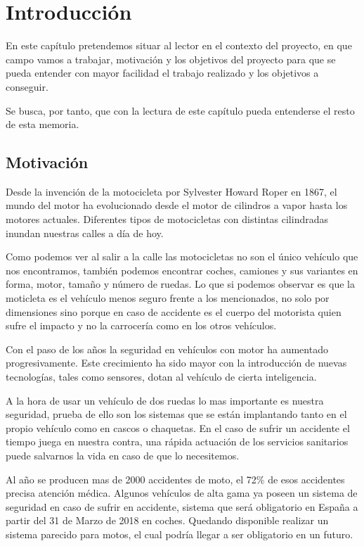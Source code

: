 \chapter{Introducci\'on}\label{cap.introduccion}
	
		En este cap\'itulo pretendemos situar al lector en el contexto del proyecto, en que campo vamos a trabajar, motivaci\'on y los objetivos del proyecto para que se pueda entender con mayor facilidad el trabajo realizado y los objetivos a conseguir.
		
		Se busca, por tanto, que con la lectura de este cap\'itulo pueda entenderse el resto de esta memoria.
		
	\section{Motivaci\'on}
		
		Desde la invenci\'on de la motocicleta por Sylvester Howard Roper en 1867, el mundo del motor ha evolucionado desde el motor de cilindros a vapor hasta los motores actuales. Diferentes tipos de motocicletas con distintas cilindradas inundan nuestras calles a d\'ia de hoy.
		
		Como podemos ver al salir a la calle las motocicletas no son el \'unico veh\'iculo que nos encontramos, tambi\'en podemos encontrar coches, camiones y sus variantes en forma, motor, tama\~no y n\'umero de ruedas. Lo que si podemos observar es que la moticleta es el veh\'iculo menos seguro frente a los mencionados, no solo por dimensiones sino porque en caso de accidente es el cuerpo del motorista quien sufre el impacto y no la carrocer\'ia como en los otros veh\'iculos.
		
		Con el paso de los a\~nos la seguridad en veh\'iculos con motor ha aumentado progresivamente. Este crecimiento ha sido mayor con la introducci\'on de nuevas tecnolog\'ias, tales como sensores, dotan al veh\'iculo de cierta inteligencia.
		
		A la hora de usar un veh\'iculo de dos ruedas lo mas importante es nuestra seguridad, prueba de ello son los sistemas que se est\'an implantando tanto en el propio veh\'iculo como en cascos o chaquetas. En el caso de sufrir un accidente el tiempo juega en nuestra contra, una r\'apida actuación de los servicios sanitarios puede salvarnos la vida en caso de que lo necesitemos.
		
		Al a\~no se producen mas de 2000 accidentes de moto, el 72\% de esos accidentes precisa atenci\'on m\'edica. Algunos veh\'iculos de alta gama ya poseen un sistema de seguridad en caso de sufrir en accidente, sistema que ser\'a obligatorio en Espa\~na a partir del 31 de Marzo de 2018 en coches. Quedando disponible realizar un sistema parecido para motos, el cual podr\'ia llegar a ser obligatorio en un futuro.
		
